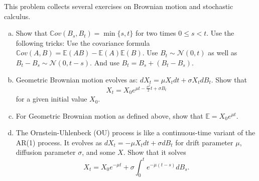 \documentclass[11pt]{extarticle}
\theoremstyle{plain}
\theoremstyle{definition}
\begin{document}
This problem collects several exercises on Brownian motion and stochastic calculus.

\begin{enumerate}[(a)]
\item Show that $\mathbb Cov(B_s, B_t) = \min\{s, t\}$ for two times $0 \leq s < t$. Use the following tricks: Use the covariance formula $\mathbb Cov(A, B) = \mathbb E (AB) - \mathbb E(A) \mathbb E(B)$. Use $B_t \sim \mathcal N(0, t)$ as well as $B_t - B_s \sim \mathcal N(0, t-s)$. And use $B_t = B_s + (B_t - B_s)$.

\item Geometric Brownian motion evolves as: $dX_t = \mu X_t dt + \sigma X_t dB_t$. Show that
\begin{equation*}
	X_t = X_0 e^{\mu t - \frac{\sigma^2}{2} t + \sigma B_t}
\end{equation*}
for a given initial value $X_0$.

\item For Geometric Brownian motion as defined above, show that $\mathbb E = X_0 e^{\mu t}$.

\item The Ornstein-Uhlenbeck (OU) process is like a continuous-time variant of the AR(1) process. It evolves as $dX_t = - \mu X_t dt + \sigma dB_t$ for drift parameter $\mu$, diffusion parameter $\sigma$, and some $X$. Show that it solves 
\begin{equation*}
	X_t = X_0 e^{- \mu t} + \sigma \int_0^t e^{-\mu(t - s)} dB_s.
\end{equation*}
\end{enumerate}
\end{document}
